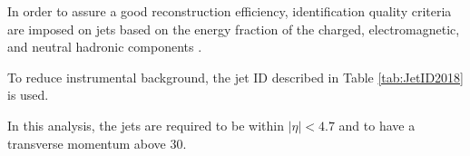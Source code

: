 \label{sec:jet_ID}
In order to assure a good reconstruction efficiency, identification quality criteria are imposed on jets based on
the energy fraction of the charged, electromagnetic, and neutral hadronic components \cite{CMS-PAS-JME-16-003}.

To reduce instrumental background, the jet ID described in Table \ref{tab:JetID2018} is used.

\begin{table}
  \caption{Jet identification criteria used in \RunII{} with thresholds used for 2018 data.}
  \label{tab:JetID2018}
\end{table}

In this analysis, the jets are required to be within $|\eta| < 4.7$ and to have a transverse momentum above 30\GeV.

